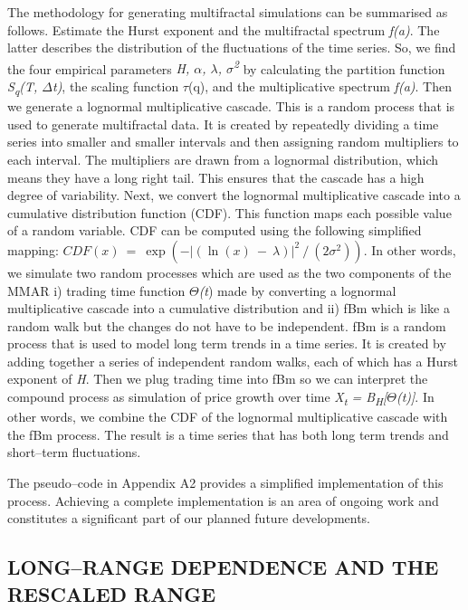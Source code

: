 \documentclass[12pt,a4paper]{report}
\numberwithin{equation}{section}
\begin{document}
The methodology for generating multifractal simulations can be
summarised as follows. Estimate the Hurst exponent and the multifractal
spectrum \emph{f(a)}. The latter describes the distribution of the
fluctuations of the time series. So, we find the four empirical
parameters \emph{H, $\alpha$, $\lambda$, $\sigma$\textsuperscript{2}} by calculating the
partition function \emph{S\textsubscript{q}(T, $\Delta$t)}, the scaling
function $\tau$(q), and the multiplicative spectrum \emph{f(a)}. Then we
generate a lognormal multiplicative cascade. This is a random process
that is used to generate multifractal data. It is created by repeatedly
dividing a time series into smaller and smaller intervals and then
assigning random multipliers to each interval. The multipliers are drawn
from a lognormal distribution, which means they have a long right tail.
This ensures that the cascade has a high degree of variability. Next, we
convert the lognormal multiplicative cascade into a cumulative
distribution function (CDF). This function maps each possible value of a
random variable. CDF can be computed using the following simplified
mapping:
\(CDF(x)\  = \ \exp( - {|(\ln(x)\  - \ \lambda)|}^{2}\ /\ (2\sigma^{2})).\)
In other words, we simulate two random processes which are used as the
two components of the MMAR i) trading time function \emph{$\Theta$(t}) made by
converting a lognormal multiplicative cascade into a cumulative
distribution and ii) fBm which is like a random walk but the changes do
not have to be independent. fBm is a random process that is used to
model long term trends in a time series. It is created by adding
together a series of independent random walks, each of which has a Hurst
exponent of \emph{H}. Then we plug trading time into fBm so we can
interpret the compound process as simulation of price growth over time
\emph{X\textsubscript{t} = B\textsubscript{H}{[}$\Theta$(t){]}}. In other
words, we combine the CDF of the lognormal multiplicative cascade with
the fBm process. The result is a time series that has both long term
trends and short--term fluctuations.

The pseudo--code in Appendix A2 provides a simplified implementation of
this process. Achieving a complete implementation is an area of ongoing
work and constitutes a significant part of our planned future
developments.

\hypertarget{long--range--dependence--and--the--rescaled--range}{%
\subsection{LONG--RANGE DEPENDENCE AND THE RESCALED
RANGE}\label{long--range--dependence--and--the--rescaled--range}}
\end{document}
